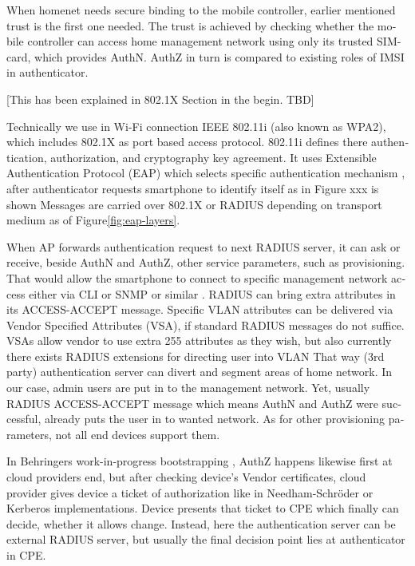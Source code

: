\documentclass[12pt,a4paper,english]{tutthesis}
\begin{document}
\begin{otherlanguage}{english}
When homenet needs secure binding to the mobile controller, earlier
mentioned trust is the first one needed.  The trust is achieved by
checking whether the mobile controller can access home management
network using only its trusted SIM-card, which provides AuthN. AuthZ in
turn is compared to existing roles of IMSI in authenticator.


[This has been explained in 802.1X Section in the begin. TBD]

Technically we use in Wi-Fi connection IEEE 802.11i (also known as WPA2), which includes
802.1X as port based access protocol.  802.11i defines there
authentication, authorization, and cryptography key agreement.
 It uses 
Extensible Authentication Protocol (EAP) which selects specific
authentication mechanism \cite[p.3]{rfc5247}, after authenticator
requests smartphone to identify itself as in Figure xxx is shown
Messages are carried over 802.1X or RADIUS depending on transport
medium as of Figure\ref{fig:eap-layers}.


When AP forwards authentication request to next RADIUS server, it can
ask or receive, beside AuthN and AuthZ, other service parameters, such
as provisioning. That would allow the smartphone to connect to
specific management network access either via CLI or SNMP or similar
 \cite[p.4]{rfc5608}.  RADIUS can bring extra attributes in its
ACCESS-ACCEPT message.  Specific VLAN attributes can be delivered via
Vendor Specified Attributes (VSA),
if standard RADIUS messages do not suffice.  VSAs allow vendor to use
extra 255 attributes as they wish, but also currently
there exists RADIUS extensions for directing user into VLAN 
That way (3rd party) authentication server can divert and
segment areas of home network. In our case, admin users are put in to
the management network.
  Yet, usually RADIUS ACCESS-ACCEPT message which means AuthN and
AuthZ were successful, already puts the user in to wanted network. As
for other provisioning parameters, not all end devices support them.






In Behringers work-in-progress  bootstrapping \cite{draft-behringer-bootstrap},
AuthZ happens likewise first at cloud providers
end, but after checking device's Vendor certificates, cloud provider
gives device a ticket of authorization like in Needham-Schröder or
Kerberos implementations. Device presents that ticket to CPE which
finally can decide, whether it allows change. 
Instead, here the authentication server can be external RADIUS server,
but usually the final decision point lies at authenticator in CPE.



\end{otherlanguage}
\end{document}
